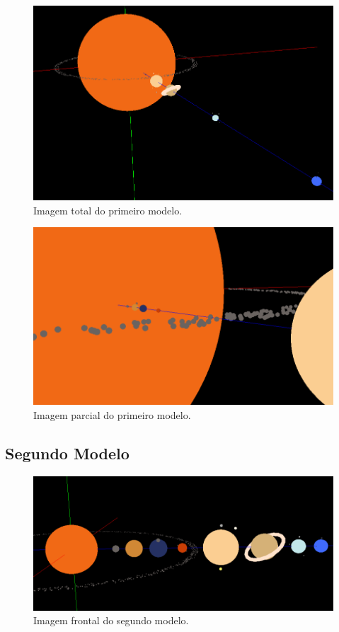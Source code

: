 \documentclass[a4paper]{article}
\begin{document}
\begin{figure}[H]
\centering
\includegraphics[scale=0.4]{modelo1_1.png}
\caption{Imagem total do primeiro modelo.}
\label{img:modelo1_1}
\end{figure}

\begin{figure}[H]
\centering
\includegraphics[scale=0.4]{modelo1_2.png}
\caption{Imagem parcial do primeiro modelo.}
\label{img:modelo1_2}
\end{figure}


\newpage

\subsection{Segundo Modelo}

\begin{figure}[H]
\centering
\includegraphics[scale=0.4]{modelo2_1.png}
\caption{Imagem frontal do segundo modelo.}
\label{img:modelo2_1}
\end{figure}
\end{document}
